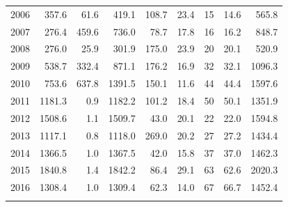\documentclass[12pt,]{article}
\begin{document}
\begin{longtable}{rrrrrrrrr}
  2006 & 357.6 & 61.6 & 419.1 & 108.7 & 23.4 & 15 & 14.6 & 565.8 \\ 
  2007 & 276.4 & 459.6 & 736.0 & 78.7 & 17.8 & 16 & 16.2 & 848.7 \\ 
  2008 & 276.0 & 25.9 & 301.9 & 175.0 & 23.9 & 20 & 20.1 & 520.9 \\ 
  2009 & 538.7 & 332.4 & 871.1 & 176.2 & 16.9 & 32 & 32.1 & 1096.3 \\ 
  2010 & 753.6 & 637.8 & 1391.5 & 150.1 & 11.6 & 44 & 44.4 & 1597.6 \\ 
  2011 & 1181.3 & 0.9 & 1182.2 & 101.2 & 18.4 & 50 & 50.1 & 1351.9 \\ 
  2012 & 1508.6 & 1.1 & 1509.7 & 43.0 & 20.1 & 22 & 22.0 & 1594.8 \\ 
  2013 & 1117.1 & 0.8 & 1118.0 & 269.0 & 20.2 & 27 & 27.2 & 1434.4 \\ 
  2014 & 1366.5 & 1.0 & 1367.5 & 42.0 & 15.8 & 37 & 37.0 & 1462.3 \\ 
  2015 & 1840.8 & 1.4 & 1842.2 & 86.4 & 29.1 & 63 & 62.6 & 2020.3 \\ 
  2016 & 1308.4 & 1.0 & 1309.4 & 62.3 & 14.0 & 67 & 66.7 & 1452.4 \\ 
   \hline
\hline
\label{tab:Northern_catch}
\end{longtable}
\end{document}
